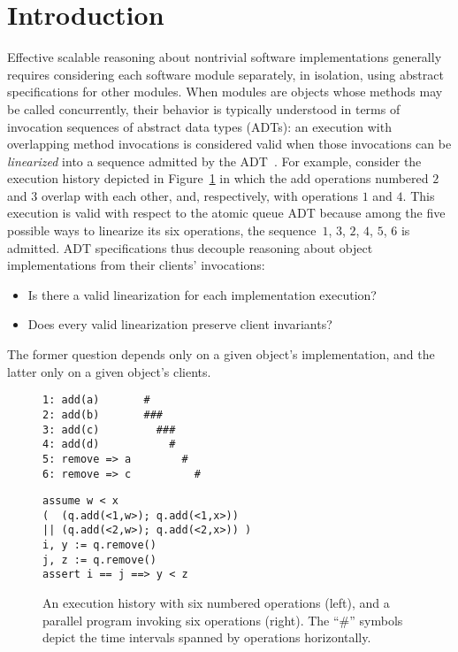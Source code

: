 \section{Introduction}
\label{sec:intro}

Effective scalable reasoning about nontrivial software implementations generally
requires considering each software module separately, in isolation, using
abstract specifications for other modules. When modules are objects whose
methods may be called concurrently, their behavior is typically understood in
terms of invocation sequences of abstract data types (ADTs): an execution with
overlapping method invocations is considered valid when those invocations can be
\emph{linearized} into a sequence admitted by the
ADT~\cite{journals/toplas/HerlihyW90}. For example, consider the execution
history depicted in Figure~\ref{fig:clients} in which the add operations
numbered $2$ and $3$ overlap with each other, and, respectively, with operations
$1$ and $4$. This execution is valid with respect to the atomic queue ADT
because among the five possible ways to linearize its six operations, the
sequence~$1$, $3$, $2$, $4$, $5$, $6$ is admitted. ADT specifications thus
decouple reasoning about object implementations from their clients’ invocations:
\begin{itemize}

  \item Is there a valid linearization for each implementation execution?

  \item Does every valid linearization preserve client invariants?

\end{itemize}
The former question depends only on a given object’s implementation, and the
latter only on a given object’s clients.

\begin{figure}[t]
  \begin{minipage}{0.43\linewidth}
    \begin{verbatim}
1: add(a)       #
2: add(b)       ###
3: add(c)         ###
4: add(d)           #
5: remove => a        #
6: remove => c          #
    \end{verbatim}
  \end{minipage}
  \hfill
  \begin{minipage}{0.55\linewidth}
    \begin{verbatim}
assume w < x
(  (q.add(<1,w>); q.add(<1,x>))
|| (q.add(<2,w>); q.add(<2,x>)) )
i, y := q.remove()
j, z := q.remove()
assert i == j ==> y < z
    \end{verbatim}
  \end{minipage}
  \caption{An execution history with six numbered operations (left),
    and a parallel program invoking six operations (right). The “\#” symbols
    depict the time intervals spanned by operations horizontally.}
  \label{fig:clients}
\end{figure}

